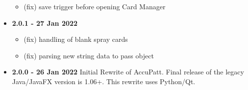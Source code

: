 \documentclass[10pt,letterpaper,titlepage]{article}
\begin{document}
\begin{itemize}
\begin{itemize}
            \item (fix) save trigger before opening Card Manager
        \end{itemize}
        \item \textbf{2.0.1 - 27 Jan 2022}
        \begin{itemize}
            \item (fix) handling of blank spray cards
            \item (fix) parsing new string data to pass object
        \end{itemize}
        \item \textbf{2.0.0 - 26 Jan 2022} Initial Rewrite of AccuPatt. Final release of the legacy Java/JavaFX version is 1.06+. This rewrite uses Python/Qt.
    \end{itemize}
\end{document}
